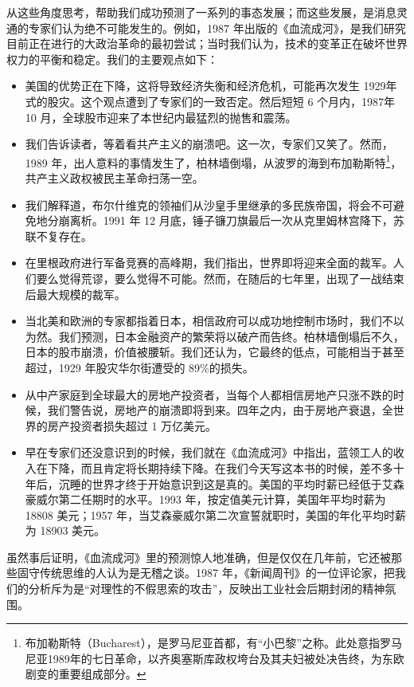 从这些角度思考，帮助我们成功预测了一系列的事态发展；而这些发展，是消息灵通的专家们认为绝不可能发生的。例如，1987 年出版的《血流成河》，是我们研究目前正在进行的大政治革命的最初尝试；当时我们认为，技术的变革正在破坏世界权力的平衡和稳定。我们的主要观点如下：

\begin{itemize}
    \item 美国的优势正在下降，这将导致经济失衡和经济危机，可能再次发生 1929年式的股灾。这个观点遭到了专家们的一致否定。然后短短 6 个月内，1987年 10 月，全球股市迎来了本世纪内最猛烈的抛售和震荡。
    \item 我们告诉读者，等着看共产主义的崩溃吧。这一次，专家们又笑了。然而，1989 年，出人意料的事情发生了，柏林墙倒塌，从波罗的海到布加勒斯特\footnote{布加勒斯特（Bucharest），是罗马尼亚首都，有“小巴黎”之称。此处意指罗马尼亚1989年的七日革命，以齐奥塞斯库政权垮台及其夫妇被处决告终，为东欧剧变的重要组成部分。}，共产主义政权被民主革命扫荡一空。
    \item 我们解释道，布尔什维克的领袖们从沙皇手里继承的多民族帝国，将会不可避免地分崩离析。1991 年 12 月底，锤子镰刀旗最后一次从克里姆林宫降下，苏联不复存在。
    \item 在里根政府进行军备竞赛的高峰期，我们指出，世界即将迎来全面的裁军。人们要么觉得荒谬，要么觉得不可能。然而，在随后的七年里，出现了一战结束后最大规模的裁军。
    \item 当北美和欧洲的专家都指着日本，相信政府可以成功地控制市场时，我们不以为然。我们预测，日本金融资产的繁荣将以破产而告终。柏林墙倒塌后不久，日本的股市崩溃，价值被腰斩。我们还认为，它最终的低点，可能相当于甚至超过，1929 年股灾华尔街遭受的 89\%的损失。
    \item 从中产家庭到全球最大的房地产投资者，当每个人都相信房地产只涨不跌的时候，我们警告说，房地产的崩溃即将到来。四年之内，由于房地产衰退，全世界的房产投资者损失超过 1 万亿美元。
    \item 早在专家们还没意识到的时候，我们就在《血流成河》中指出，蓝领工人的收入在下降，而且肯定将长期持续下降。在我们今天写这本书的时候，差不多十年后，沉睡的世界才终于开始意识到这是真的。美国的平均时薪已经低于艾森豪威尔第二任期时的水平。1993 年，按定值美元计算，美国年平均时薪为 18808 美元；1957 年，当艾森豪威尔第二次宣誓就职时，美国的年化平均时薪为 18903 美元。
\end{itemize}


虽然事后证明，《血流成河》里的预测惊人地准确，但是仅仅在几年前，它还被那些固守传统思维的人认为是无稽之谈。1987 年，《新闻周刊》的一位评论家，把我们的分析斥为是“对理性的不假思索的攻击”，反映出工业社会后期封闭的精神氛围。


